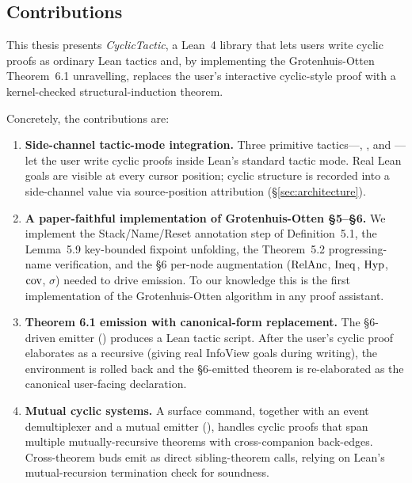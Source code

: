 \subsection{Contributions}

This thesis presents \emph{CyclicTactic}, a Lean~4 library that lets users
write cyclic proofs as ordinary Lean tactics and, by implementing the
Grotenhuis-Otten Theorem~6.1 unravelling, replaces the user's interactive
cyclic-style proof with a kernel-checked structural-induction theorem.

Concretely, the contributions are:

\begin{enumerate}
  \item \textbf{Side-channel tactic-mode integration.} Three primitive
    tactics---, , and
    ---let the user write cyclic proofs inside
    Lean's standard tactic mode. Real Lean goals are visible at every
    cursor position; cyclic structure is recorded into a side-channel
     value via source-position attribution
    (§\ref{sec:architecture}).

  \item \textbf{A paper-faithful implementation of Grotenhuis-Otten §5--§6.}
    We implement the Stack/Name/Reset annotation step of Definition~5.1, the
    Lemma~5.9 key-bounded fixpoint unfolding, the Theorem~5.2
    progressing-name verification, and the §6 per-node augmentation
    (\(\mathrm{RelAnc}\), \(\mathrm{Ineq}\), \(\mathrm{Hyp}\), \(\mathrm{cov}\), \(\sigma\)) needed to
    drive emission. To our knowledge this is the first implementation of
    the Grotenhuis-Otten algorithm in any proof assistant.

  \item \textbf{Theorem 6.1 emission with canonical-form replacement.}
    The §6-driven emitter () produces a
    Lean tactic script. After the user's cyclic proof elaborates as a
    recursive  (giving real InfoView goals during writing), the
    environment is rolled back and the §6-emitted theorem is re-elaborated as
    the canonical user-facing declaration.

  \item \textbf{Mutual cyclic systems.} A  surface
    command, together with an event demultiplexer and a mutual emitter
    (), handles cyclic proofs that span
    multiple mutually-recursive theorems with cross-companion back-edges.
    Cross-theorem buds emit as direct sibling-theorem calls, relying on
    Lean's mutual-recursion termination check for soundness.


\end{enumerate}
